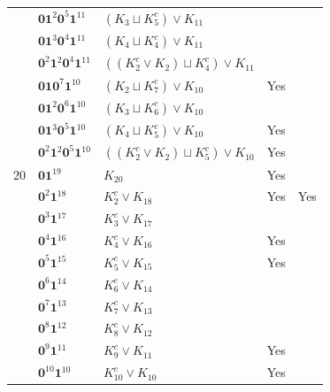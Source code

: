 \documentclass[preprint]{elsarticle}
\begin{document}
\begin{center}
\begin{longtable}{p{0.7cm} p{2cm} p{4cm} p{1cm} p{0cm}}
&$\mathbf{0} \mathbf{1}^{2} \mathbf{0}^5 \mathbf{1}^{11}$ & $ (K_{3} \sqcup K_{5}^c) \vee K_{11}$ & &\\
&$\mathbf{0} \mathbf{1}^{3} \mathbf{0}^4 \mathbf{1}^{11}$ & $ (K_{4} \sqcup K_{4}^c) \vee K_{11}$ & &\\
&$\mathbf{0}^{2} \mathbf{1}^{2} \mathbf{0}^4 \mathbf{1}^{11}$ & $((K_{2}^c \vee K_{2}) \sqcup K_{4}^c) \vee K_{11}$ & &\\
&$\mathbf{0} \mathbf{1} \mathbf{0}^7 \mathbf{1}^{10}$ & $(K_{2} \sqcup K_{7}^c) \vee K_{10}$ &Yes &\\
&$\mathbf{0} \mathbf{1}^{2} \mathbf{0}^6 \mathbf{1}^{10}$ & $(K_{3} \sqcup K_{6}^c) \vee K_{10}$ & &\\
&$\mathbf{0} \mathbf{1}^{3} \mathbf{0}^5 \mathbf{1}^{10}$ & $(K_{4} \sqcup K_{5}^c) \vee K_{10}$ &Yes &\\
&$\mathbf{0}^{2} \mathbf{1}^{2} \mathbf{0}^5 \mathbf{1}^{10}$ & $((K_{2}^{c} \vee K_{2}) \sqcup K_{5}^{c}) \vee K_{10}$ &Yes  &\\
\hline
20&$\mathbf{0}\mathbf{1}^{19}$ & $ K_{20}$ &Yes &\\
&$\mathbf{0}^2 \mathbf{1}^{18}$ & $ K_{2}^c \vee K_{18}$ &Yes & Yes\\
&$\mathbf{0}^3 \mathbf{1}^{17}$ & $ K_{3}^c \vee K_{17}$ &  &\\
&$\mathbf{0}^4 \mathbf{1}^{16}$ & $ K_{4}^c \vee K_{16}$ &Yes &\\
&$\mathbf{0}^5 \mathbf{1}^{15}$ & $ K_{5}^c \vee K_{15}$ &Yes &\\
&$\mathbf{0}^6 \mathbf{1}^{14}$ & $ K_{6}^c \vee K_{14}$ & &\\
&$\mathbf{0}^7 \mathbf{1}^{13}$ & $ K_{7}^c \vee K_{13}$ & &\\
&$\mathbf{0}^8 \mathbf{1}^{12}$ & $ K_{8}^c \vee K_{12}$ &  &\\
&$\mathbf{0}^9 \mathbf{1}^{11}$ & $ K_{9}^c \vee K_{11}$ & Yes &\\
&$\mathbf{0}^{10} \mathbf{1}^{10}$ & $ K_{10}^c \vee K_{10}$ & Yes &\\


\end{longtable}
\end{center}
\end{document}
